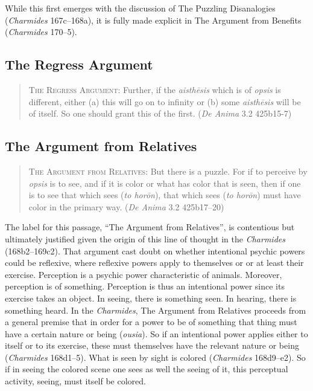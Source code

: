 While this first emerges with the discussion of The Puzzling Disanalogies (\emph{Char\-mi\-des} 167c–168a), it is fully made explicit in The Argument from Benefits (\emph{Char\-mi\-des} 170–5).


\subsection{The Regress Argument} %
\label{sub:the_regress_argument}

\begin{quote}
	\textsc{The Regress Argument}: Further, if the \emph{aisthēsis} which is of \emph{opsis} is different, either (a) this will go on to infinity or (b) some \emph{aisthēsis} will be of itself. So one should grant this of the first. (\emph{De Anima} 3.2 425b15-7)
\end{quote}




\subsection{The Argument from Relatives} %
\label{sub:the_argument_from_relatives}

\begin{quote}
	\textsc{The Argument from Relatives}: But there is a puzzle. For if to perceive by \emph{opsis} is to see, and if it is color or what has color that is seen, then if one is to see that which sees (\emph{to horōn}), that which sees (\emph{to horōn}) must have color in the primary way. (\emph{De Anima} 3.2 425b17–20)
\end{quote}

The label for this passage, ``The Argument from Relatives'', is contentious but ultimately justified given the origin of this line of thought in the \emph{Charmides} (168b2–169c2). That argument cast doubt on whether intentional psychic powers could be reflexive, where reflexive powers apply to themselves or or at least their exercise. Perception is a psychic power characteristic of animals. Moreover, perception is of something. Perception is thus an intentional power since its exercise takes an object. In seeing, there is something seen. In hearing, there is something heard. In the \emph{Charmides}, The Argument from Relatives proceeds from a general premise that in order for a power to be of something that thing must have a certain nature or being (\emph{ousia}). So if an intentional power applies either to itself or to its exercise, these must themselves have the relevant nature or being (\emph{Charmides} 168d1–5). What is seen by sight is colored (\emph{Charmides} 168d9–e2). So if in seeing the colored scene one sees as well the seeing of it, this perceptual activity, seeing, must itself be colored.

